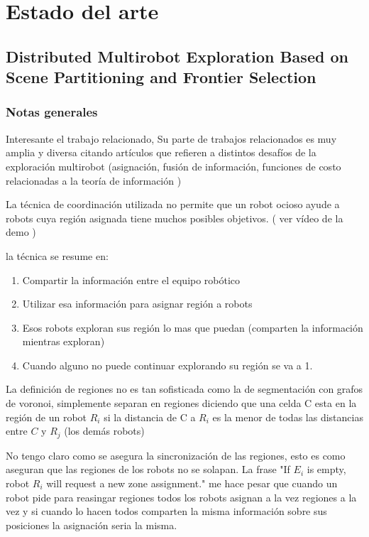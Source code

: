 \section{Estado del arte}

\subsection{Distributed Multirobot Exploration Based on Scene Partitioning and Frontier Selection}
\subsubsection{Notas generales}

Interesante el trabajo relacionado, Su parte de trabajos relacionados es muy amplia y diversa citando artículos que refieren a distintos desafíos de la exploración multirobot (asignación, fusión de información, funciones de costo relacionadas a la teoría de información )

La técnica de coordinación utilizada no permite que un robot ocioso ayude a robots cuya región asignada tiene muchos posibles objetivos. ( ver vídeo de la demo )

la técnica se resume en:
\begin{enumerate}
  \item Compartir la información entre el equipo robótico
  \item Utilizar esa información para asignar región a robots
  \item Esos robots exploran sus región lo mas que puedan (comparten la información mientras exploran)
  \item Cuando alguno no puede continuar explorando su región se va a 1.
\end{enumerate}

La definición de regiones no es tan sofisticada como la de segmentación con grafos de voronoi, simplemente separan en regiones diciendo que una celda C esta en la región de un robot $R_i$ si la distancia de C a $R_i$ es la menor de todas las distancias entre $C$ y $R_j$ (los demás robots)

No tengo claro como se asegura la sincronización de las regiones, esto es como aseguran que las regiones de los robots no se solapan. La frase "If $E_i$ is empty, robot $R_i$ will request a new zone assignment." me hace pesar que cuando un robot pide para reasingar regiones todos los robots asignan a la vez regiones a la vez y si cuando lo hacen todos comparten la misma información sobre sus posiciones la asignación seria la misma.


